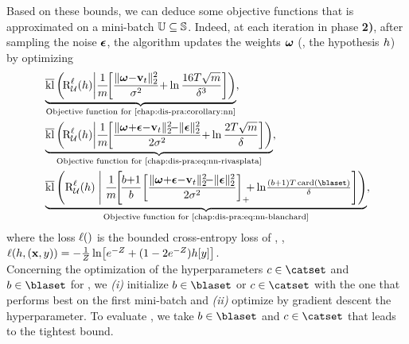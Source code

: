 \begin{noaddcontents}
Based on these bounds, we can deduce some objective functions that is approximated on a mini-batch $\mathbb{U}\subseteq\mathbb{S}$. 
Indeed, at each iteration in phase {\bf 2)}, after sampling the noise $\boldsymbol{\epsilon}$, the algorithm updates the weights $\boldsymbol{\omega}$ (\ie, the hypothesis $h$) by optimizing 
\begin{align*}
&\underbrace{\klmax\LP\!\RiskLoss_{\dbatch}(\h) \middle\vert  \frac{1}{\m}\!\!\LB\frac{\|\omegabf{-}\vbf_\t\|_{2}^{2}}{\sigma^2}{+}\ln\frac{16\iter\sqrt{\m}}{\delta^3}\RB\RP}_{\text{Objective function for \Cref{chap:dis-pra:corollary:nn}}},\\
&\underbrace{\klmax\LP\!\RiskLoss_{\dbatch}(\h) \middle\vert \frac{1}{\m}\!\!\LB\frac{\| \omegabf{+}\epsilonbf{-}\vbf_\t\|^2_{2}\!{-}\|\epsilonbf\|^2_{2}}{2\sigma^2}{+}\ln\frac{2\iter\sqrt{\m}}{\delta}\RB\RP}_{\text{Objective function for \Cref{chap:dis-pra:eq:nn-rivasplata}}},\\
&\underbrace{\klmax\LP\RiskLoss_{\dbatch}(\h) \;\middle\vert\; \frac{1}{\m}\!\!\LB\!\frac{b{+}1}{b}\!\LB\frac{\| \omegabf{+}\epsilonbf{-}\vbf_\t\|^2_{2}\!{-}\|\epsilonbf\|^2_{2}}{2\sigma^2}\RB_{+}\!\!\!{+} \ln\!\tfrac{(b{+}1)\iter\card(\blaset)}{\delta}\RB\RP}_{\text{Objective function for \Cref{chap:dis-pra:eq:nn-blanchard}}},
\end{align*}
where the loss $\ell()$ is the bounded cross-entropy loss of \citet{DziugaiteRoy2018}, \ie, $\ell(h, (\mathbf{x},y)) = -\frac{1}{Z}\ln\!\left[ e^{-Z}+(1-2e^{-Z})h[y]\right]$.\\

Concerning the optimization of the hyperparameters $c\in\catset$ and $b\in\blaset$ for , we {\it (i)} initialize $b\in\blaset$ or $c\in\catset$ with the one that performs best on the first mini-batch and {\it (ii)} optimize by gradient descent the hyperparameter.
To evaluate , we take $b\in\blaset$ and $c\in\catset$ that leads to the tightest bound.


\end{noaddcontents}
